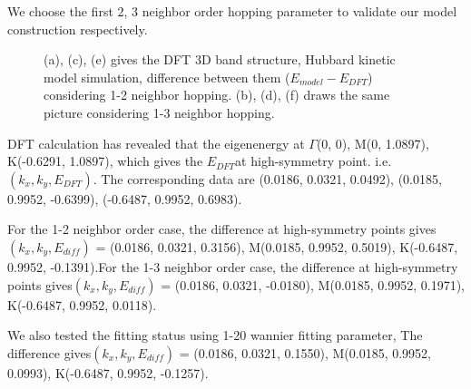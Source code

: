 \documentclass[reprint, aps, prb, showkeys]{revtex4-2}
\begin{document}
We choose the first 2, 3 neighbor order hopping parameter to validate our model construction respectively.
\begin{figure}[b]
    \centering
    \quad
    \quad
    \quad
    \caption{(a), (c), (e) gives the DFT 3D band structure, Hubbard kinetic model simulation, difference between them ($E_{model} - E_{DFT}$) considering 1-2 neighbor hopping. (b), (d), (f) draws the same picture considering 1-3 neighbor hopping.}
\end{figure}
DFT calculation has revealed that the eigenenergy at $\Gamma$(0, 0), M(0, 1.0897), K(-0.6291, 1.0897), which gives the $E_{DFT}$at high-symmetry point. i.e.$(k_x, k_y, E_{DFT})$. The corresponding data are (0.0186, 0.0321, 0.0492), (0.0185, 0.9952, -0.6399), (-0.6487, 0.9952, 0.6983).

For the 1-2 neighbor order case, the difference at high-symmetry points gives$(k_x, k_y, E_{diff})$ = (0.0186, 0.0321, 0.3156), M(0.0185, 0.9952, 0.5019), K(-0.6487, 0.9952, -0.1391).For the 1-3 neighbor order case, the difference at high-symmetry points gives$(k_x, k_y, E_{diff})$ = (0.0186, 0.0321, -0.0180), M(0.0185, 0.9952, 0.1971), K(-0.6487, 0.9952, 0.0118).

We also tested the fitting status using 1-20 wannier fitting parameter, The difference gives$(k_x, k_y, E_{diff})$ = (0.0186, 0.0321, 0.1550), M(0.0185, 0.9952, 0.0993), K(-0.6487, 0.9952, -0.1257).
\end{document}
